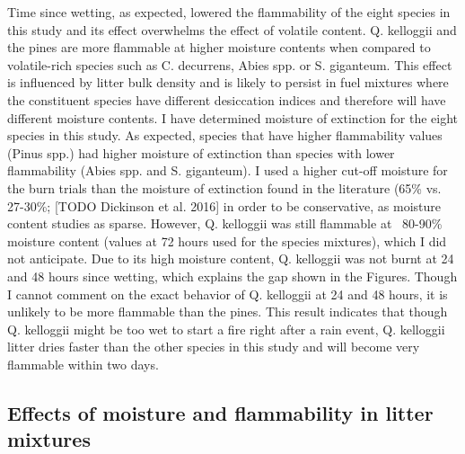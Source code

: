 \documentclass[fire,article,submit,moreauthors,pdftex]{Definitions/mdpi}
\begin{document}
Time since wetting, as expected, lowered the flammability of the eight species in this study and its effect overwhelms the effect of volatile content. Q. kelloggii and the pines are more flammable at higher moisture contents when compared to volatile-rich species such as C. decurrens, Abies spp. or S. giganteum. This effect is influenced by litter bulk density and is likely to persist in fuel mixtures where the constituent species have different desiccation indices and therefore will have different moisture contents. I have determined moisture of extinction for the eight species in this study. As expected, species that have higher flammability values (Pinus spp.) had higher moisture of extinction than species with lower flammability (Abies spp. and S. giganteum). I used a higher cut-off moisture for the burn trials than the moisture of extinction found in the literature (65\% vs. 27-30\%; \citep{ Rothermel-1972} [TODO Dickinson et al. 2016] in order to be conservative, as moisture content studies as sparse. However, Q. kelloggii was still flammable at ~80-90\% moisture content (values at 72 hours used for the species mixtures), which I did not anticipate. Due to its high moisture content, Q. kelloggii was not burnt at 24 and 48 hours since wetting, which explains the gap shown in the Figures. Though I cannot comment on the exact behavior of Q. kelloggii at 24 and 48 hours, it is unlikely to be more flammable than the pines. This result indicates that though Q. kelloggii might be too wet to start a fire right after a rain event, Q. kelloggii litter dries faster than the other species in this study and will become very flammable within two days.

\subsection{Effects of moisture and flammability in litter mixtures}
\end{document}
